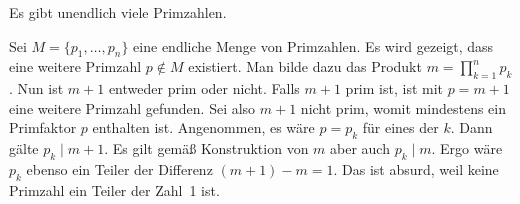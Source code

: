 \begin{Satz}
Es gibt unendlich viele Primzahlen.
\end{Satz}
\begin{Beweis}
Sei $M=\{p_1,\ldots,p_n\}$ eine endliche Menge von Primzahlen.
Es wird gezeigt, dass eine weitere Primzahl $p\notin M$ existiert.
Man bilde dazu das Produkt $m=\prod_{k=1}^n p_k$. Nun ist $m+1$ entweder
prim oder nicht. Falls $m+1$ prim ist, ist mit $p=m+1$ eine weitere
Primzahl gefunden. Sei also $m+1$ nicht prim, womit mindestens
ein Primfaktor $p$ enthalten ist. Angenommen, es wäre $p=p_k$ für eines
der $k$. Dann gälte $p_k\mid m+1$. Es gilt gemäß Konstruktion von $m$
aber auch $p_k\mid m$. Ergo wäre $p_k$ ebenso ein Teiler der
Differenz $(m+1)-m = 1$. Das ist absurd, weil keine Primzahl
ein Teiler der Zahl~1 ist.\,\qedsymbol
\end{Beweis}

